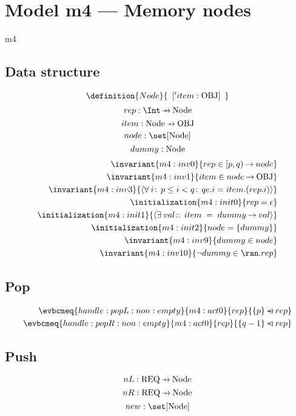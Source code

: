 \documentclass[12pt]{amsart}
\newcommand{\REQ}{\text{REQ}}
\begin{document}
\section{Model m4 --- Memory nodes}
\newcommand{\Node}{\text{Node}}
  
\begin{machine}{m4}
\subsection{Data structure}
  \newset{\Node}
  \[ \definition{Node}{ 
      \begin{array}{l}
      [ 'item : \OBJ ] 
      \end{array}
      } \]
  \[ \variable{ rep : \Int \pfun \Node } \]
  \[ \variable{ item : \Node \pfun \OBJ } \]
  \[ \variable{ node : \set [\Node] } \]
  \[ \constant{ dummy : \Node } \]
  \begin{align}
    \invariant{m4:inv0}
      { rep \in \intervalR{p}{q} \tfun node } \\
    \invariant{m4:inv1}
      { item \in node \tfun \OBJ } \\
    \invariant{m4:inv3}
      { \qforall{i}{\betweenR{p}{i}{q}}{ qe.i = item.(rep.i) } } \\
    \initialization{m4:init0}{ rep  = \emptyfun } \\
    \initialization{m4:init1}
      { \qexists{val}{}{ item \1= dummy \fun val } } \\
    \initialization{m4:init2}{ node = \{ dummy \} } \\
    \invariant{m4:inv9}
      { dummy \in node } \\
    \invariant{m4:inv10}
      { \neg dummy \in \ran.rep }
  \end{align}
\subsection{Pop}
  \begin{align}
    \evbcmeq{handle:popL:non:empty}{m4:act0}{rep}
      { \{ p \} \domsub rep } \\
    \evbcmeq{handle:popR:non:empty}{m4:act0}{rep}
      { \{ q-1 \} \domsub rep }
  \end{align}
\subsection{Push}
  \[ \variable{ nL : \REQ \pfun \Node } \]
  \[ \variable{ nR : \REQ \pfun \Node } \]
  \[ \variable{ new : \set [\Node] } \]

\end{machine}
\end{document}
